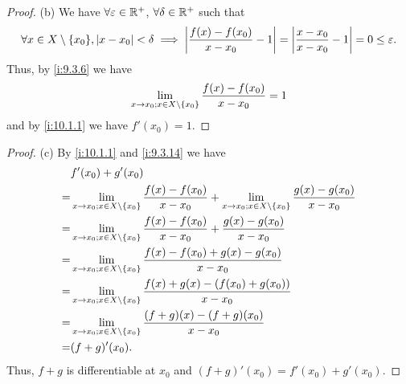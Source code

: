 \begin{proof}{(b)}
  We have \(\forall \varepsilon \in \mathbb{R}^+\), \(\forall \delta \in \mathbb{R}^+\) such that
  \[
    \forall x \in X \setminus \set{x_0}, \abs{x - x_0} < \delta \implies \abs{\dfrac{f(x) - f(x_0)}{x - x_0} - 1} = \abs{\dfrac{x - x_0}{x - x_0} - 1} = 0 \leq \varepsilon.
  \]
  Thus, by \cref{i:9.3.6} we have
  \[
    \lim_{x \to x_0 ; x \in X \setminus \left\lbrace x_0\right\rbrace} \dfrac{f(x) - f(x_0)}{x - x_0} = 1
  \]
  and by \cref{i:10.1.1} we have \(f'(x_0) = 1\).
\end{proof}

\begin{proof}{(c)}
  By \cref{i:10.1.1} and \cref{i:9.3.14} we have
  \begin{align*}
      & f'(x_0) + g'(x_0)                                                                                                                                             \\
    = & \lim_{x \to x_0 ; x \in X \setminus \left\lbrace x_0\right\rbrace} \dfrac{f(x) - f(x_0)}{x - x_0} + \lim_{x \to x_0 ; x \in X \setminus \left\lbrace x_0\right\rbrace} \dfrac{g(x) - g(x_0)}{x - x_0} \\
    = & \lim_{x \to x_0 ; x \in X \setminus \left\lbrace x_0\right\rbrace} \dfrac{f(x) - f(x_0)}{x - x_0} + \dfrac{g(x) - g(x_0)}{x - x_0}                                                \\
    = & \lim_{x \to x_0 ; x \in X \setminus \left\lbrace x_0\right\rbrace} \dfrac{f(x) - f(x_0) + g(x) - g(x_0)}{x - x_0}                                                                 \\
    = & \lim_{x \to x_0 ; x \in X \setminus \left\lbrace x_0\right\rbrace} \dfrac{f(x) + g(x) - (f(x_0) + g(x_0))}{x - x_0}                                                               \\
    = & \lim_{x \to x_0 ; x \in X \setminus \left\lbrace x_0\right\rbrace} \dfrac{(f + g)(x) - (f + g)(x_0)}{x - x_0}                                                                     \\
    = & (f + g)'(x_0).
  \end{align*}
  Thus, \(f + g\) is differentiable at \(x_0\) and \((f + g)'(x_0) = f'(x_0) + g'(x_0)\).
\end{proof}

